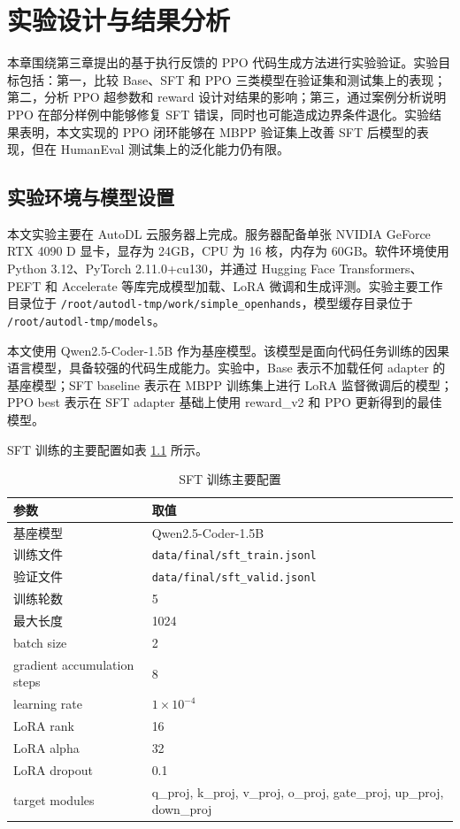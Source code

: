 
\chapter{实验设计与结果分析}

本章围绕第三章提出的基于执行反馈的 PPO 代码生成方法进行实验验证。实验目标包括：第一，比较 Base、SFT 和 PPO 三类模型在验证集和测试集上的表现；第二，分析 PPO 超参数和 reward 设计对结果的影响；第三，通过案例分析说明 PPO 在部分样例中能够修复 SFT 错误，同时也可能造成边界条件退化。实验结果表明，本文实现的 PPO 闭环能够在 MBPP 验证集上改善 SFT 后模型的表现，但在 HumanEval 测试集上的泛化能力仍有限。

\section{实验环境与模型设置}

本文实验主要在 AutoDL 云服务器上完成。服务器配备单张 NVIDIA GeForce RTX 4090 D 显卡，显存为 24GB，CPU 为 16 核，内存为 60GB。软件环境使用 Python 3.12、PyTorch 2.11.0+cu130，并通过 Hugging Face Transformers、PEFT 和 Accelerate 等库完成模型加载、LoRA 微调和生成评测。实验主要工作目录位于 \texttt{/root/autodl-tmp/work/simple\_openhands}，模型缓存目录位于 \texttt{/root/autodl-tmp/models}。

本文使用 Qwen2.5-Coder-1.5B 作为基座模型。该模型是面向代码任务训练的因果语言模型，具备较强的代码生成能力。实验中，Base 表示不加载任何 adapter 的基座模型；SFT baseline 表示在 MBPP 训练集上进行 LoRA 监督微调后的模型；PPO best 表示在 SFT adapter 基础上使用 reward\_v2 和 PPO 更新得到的最佳模型。

SFT 训练的主要配置如表 \ref{tab:sft-config} 所示。

\begin{table}[!htp]
  \centering
  \caption{SFT 训练主要配置}
  \label{tab:sft-config}
  \begin{tabular}{ll}
    \toprule
    参数 & 取值 \\
    \midrule
    基座模型 & Qwen2.5-Coder-1.5B \\
    训练文件 & \texttt{data/final/sft\_train.jsonl} \\
    验证文件 & \texttt{data/final/sft\_valid.jsonl} \\
    训练轮数 & 5 \\
    最大长度 & 1024 \\
    batch size & 2 \\
    gradient accumulation steps & 8 \\
    learning rate & $1\times10^{-4}$ \\
    LoRA rank & 16 \\
    LoRA alpha & 32 \\
    LoRA dropout & 0.1 \\
    target modules & q\_proj, k\_proj, v\_proj, o\_proj, gate\_proj, up\_proj, down\_proj \\
    \bottomrule
  \end{tabular}
\end{table}

